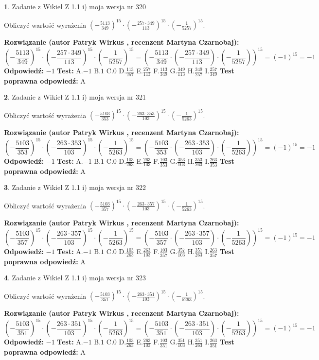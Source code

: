 \documentclass[12pt, a4paper]{article}
\theoremstyle{definition} %
\newtheorem{zad}{}
\newcommand{\zadStart}[1]{\begin{zad}#1\newline}
\newcommand{\zadStop}{\end{zad}}
\newcommand{\rozwStart}[2]{\noindent \textbf{Rozwiązanie (autor #1 , recenzent #2): }\newline}
\newcommand{\rozwStop}{\newline}
\newcommand{\odpStart}{\noindent \textbf{Odpowiedź:}\newline}
\newcommand{\odpStop}{\newline}
\newcommand{\testStart}{\noindent \textbf{Test:}\newline}
\newcommand{\testStop}{\newline}
\newcommand{\kluczStart}{\noindent \textbf{Test poprawna odpowiedź:}\newline}
\newcommand{\kluczStop}{\newline}
\begin{document}
\zadStart{Zadanie z Wikieł Z 1.1 i) moja wersja nr 320}

Obliczyć wartość wyrażenia $(-\frac{5113}{349})^{15} \cdot (-\frac{257 \cdot 349}{113})^{15} \cdot (-\frac{1}{5257})^{15}$.
\zadStop
\rozwStart{Patryk Wirkus}{Martyna Czarnobaj}
$$(-\frac{5113}{349})^{15} \cdot (-\frac{257 \cdot 349}{113})^{15} \cdot (-\frac{1}{5257})^{15} = (-\frac{5113}{349} \cdot (-\frac{257 \cdot 349}{113}) \cdot (-\frac{1}{5257}))^{15} = (-1)^{15} = -1$$
\rozwStop
\odpStart
$-1$
\odpStop
\testStart
A.$-1$ B.$1$ C.$0$ D.$\frac{113}{257}$ E.$\frac{257}{113}$
F.$\frac{113}{349}$ G.$\frac{349}{113}$
H.$\frac{349}{257}$
I.$\frac{257}{349}$
\testStop
\kluczStart
A
\kluczStop



\zadStart{Zadanie z Wikieł Z 1.1 i) moja wersja nr 321}

Obliczyć wartość wyrażenia $(-\frac{5103}{353})^{15} \cdot (-\frac{263 \cdot 353}{103})^{15} \cdot (-\frac{1}{5263})^{15}$.
\zadStop
\rozwStart{Patryk Wirkus}{Martyna Czarnobaj}
$$(-\frac{5103}{353})^{15} \cdot (-\frac{263 \cdot 353}{103})^{15} \cdot (-\frac{1}{5263})^{15} = (-\frac{5103}{353} \cdot (-\frac{263 \cdot 353}{103}) \cdot (-\frac{1}{5263}))^{15} = (-1)^{15} = -1$$
\rozwStop
\odpStart
$-1$
\odpStop
\testStart
A.$-1$ B.$1$ C.$0$ D.$\frac{103}{263}$ E.$\frac{263}{103}$
F.$\frac{103}{353}$ G.$\frac{353}{103}$
H.$\frac{353}{263}$
I.$\frac{263}{353}$
\testStop
\kluczStart
A
\kluczStop



\zadStart{Zadanie z Wikieł Z 1.1 i) moja wersja nr 322}

Obliczyć wartość wyrażenia $(-\frac{5103}{357})^{15} \cdot (-\frac{263 \cdot 357}{103})^{15} \cdot (-\frac{1}{5263})^{15}$.
\zadStop
\rozwStart{Patryk Wirkus}{Martyna Czarnobaj}
$$(-\frac{5103}{357})^{15} \cdot (-\frac{263 \cdot 357}{103})^{15} \cdot (-\frac{1}{5263})^{15} = (-\frac{5103}{357} \cdot (-\frac{263 \cdot 357}{103}) \cdot (-\frac{1}{5263}))^{15} = (-1)^{15} = -1$$
\rozwStop
\odpStart
$-1$
\odpStop
\testStart
A.$-1$ B.$1$ C.$0$ D.$\frac{103}{263}$ E.$\frac{263}{103}$
F.$\frac{103}{357}$ G.$\frac{357}{103}$
H.$\frac{357}{263}$
I.$\frac{263}{357}$
\testStop
\kluczStart
A
\kluczStop



\zadStart{Zadanie z Wikieł Z 1.1 i) moja wersja nr 323}

Obliczyć wartość wyrażenia $(-\frac{5103}{351})^{15} \cdot (-\frac{263 \cdot 351}{103})^{15} \cdot (-\frac{1}{5263})^{15}$.
\zadStop
\rozwStart{Patryk Wirkus}{Martyna Czarnobaj}
$$(-\frac{5103}{351})^{15} \cdot (-\frac{263 \cdot 351}{103})^{15} \cdot (-\frac{1}{5263})^{15} = (-\frac{5103}{351} \cdot (-\frac{263 \cdot 351}{103}) \cdot (-\frac{1}{5263}))^{15} = (-1)^{15} = -1$$
\rozwStop
\odpStart
$-1$
\odpStop
\testStart
A.$-1$ B.$1$ C.$0$ D.$\frac{103}{263}$ E.$\frac{263}{103}$
F.$\frac{103}{351}$ G.$\frac{351}{103}$
H.$\frac{351}{263}$
I.$\frac{263}{351}$
\testStop
\kluczStart
A
\kluczStop
\end{document}
